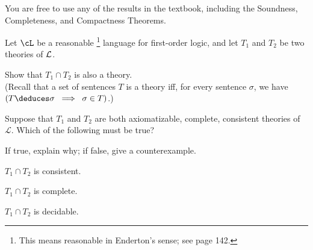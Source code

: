 \begin{problem}
  You are free to use any of the results in the textbook,
  including the Soundness, Completeness, and Compactness Theorems.

  \bigskip
  
  
  Let $\cL$ be a reasonable
  \footnote{
    This means reasonable in Enderton's sense;
    see page 142.}
  language for first-order logic, and let $T_1$ and $T_2$ be two theories of
  $\mathcal{L}$.
  \begin{enumalph}
    \item Show that $T_1 \cap T_2$ is also a theory.\\
      (Recall that a set of sentences $T$ is a theory iff,
      for every sentence $\sigma$, we have
      $(T \deduces \sigma \;\implies\; \sigma \in T)$.)
    
    \begin{Answer}

    \end{Answer}

    \item Suppose that $T_1$ and $T_2$ are both 
      axiomatizable, complete, consistent theories of $\mathcal L$.
      Which of the following must be true?
      
      \step
      If true, explain why; if false, give a counterexample.

      \begin{enumroman}
        \item $T_1 \cap T_2$ is consistent.
          \begin{Answer}

          \end{Answer}
        \item $T_1 \cap T_2$ is complete.
          \begin{Answer}

          \end{Answer}
        \item $T_1 \cap T_2$ is decidable.
          \begin{Answer}

          \end{Answer}
      \end{enumroman}
  \end{enumalph}
\end{problem}
